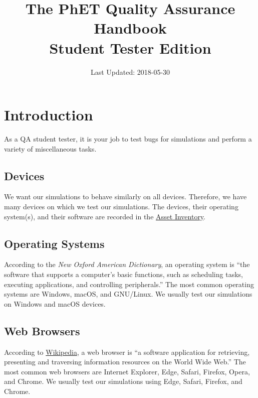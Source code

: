 \documentclass[titlepage]{article}
\title{The PhET Quality Assurance Handbook \\ Student Tester Edition}
\date{Last Updated: 2018-05-30}
\author{}
\begin{document}
\maketitle

\tableofcontents

\pagebreak


\section{Introduction}

As a QA student tester, it is your job to test bugs for simulations and perform a variety of miscellaneous tasks.

	\subsection{Devices}

We want our simulations to behave similarly on all devices. Therefore, we have many devices on which we test our simulations. The devices, their operating system(s), and their software are recorded in the \href{https://docs.google.com/spreadsheets/d/1XqnlW8DAlt2fZHDfDgkTMmMLpJZ1c0equBaPdkn2V08/edit#gid=0}{Asset Inventory}.

	\subsection{Operating Systems}

According to the \textit{New Oxford American Dictionary}, an operating system is ``the software that supports a computer's basic functions, such as scheduling tasks, executing applications, and controlling peripherals.'' The most common operating systems are Windows, macOS, and GNU/Linux. We usually test our simulations on Windows and macOS devices.

	\subsection{Web Browsers}

According to \href{https://en.wikipedia.org/wiki/Web_browser}{Wikipedia}, a web browser is ``a software application for retrieving, presenting and traversing information resources on the World Wide Web.'' The most common web browsers are Internet Explorer, Edge, Safari, Firefox, Opera, and Chrome. We usually test our simulations using Edge, Safari, Firefox, and Chrome.
\end{document}
